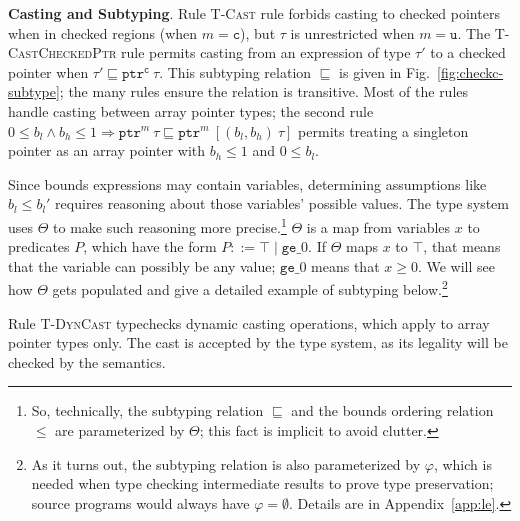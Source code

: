 \documentclass[conference]{IEEEtran}
\newcommand{\myparagraph}[1]{\textbf{#1}.\xspace}
\newcommand{\tarray}[3]{\tarrayb{({#1},{#2})}{#3}}
\newcommand{\tarrayb}[2]{\ensuremath{[{#1}~{#2}]}}
\newcommand{\tptr}[2]{\ensuremath{\mathtt{ptr}^{#2}~{#1}}}
\newcommand{\tarrayptr}[4]{{\tptr{\tarray{#1}{#2}{#3}}{#4}}}
\newcommand{\cmode}{\texttt{c}}
\newcommand{\umode}{\texttt{u}}
\begin{document}
\myparagraph{Casting and Subtyping}
Rule \textsc{T-Cast} rule forbids casting to checked pointers when in checked
regions (when $m = \cmode$), but $\tau$ is unrestricted when
$m = \umode$. The \textsc{T-CastCheckedPtr} rule
permits casting from an expression of type $\tau'$ to a checked pointer when
$\tau' \sqsubseteq \tptr{\tau}{\cmode}$. This subtyping relation
$\sqsubseteq$ is given in Fig.~\ref{fig:checkc-subtype}; the many
rules ensure the relation is transitive. Most of the rules handle
casting between array pointer types; the second rule 
$0\le b_l \wedge b_h \le 1 \Rightarrow \tptr{\tau}{m}\sqsubseteq
\tarrayptr{b_l}{b_h}{\tau}{m}$ permits treating a singleton
pointer as an array pointer with $b_h\le 1$ and $0 \le b_l$.

Since bounds expressions may
contain variables, determining assumptions like $b_l \leq b_l'$
requires reasoning about those variables' possible values. The type
system uses $\Theta$ to make such reasoning more precise.\footnote{So,
  technically, the subtyping relation $\sqsubseteq$ and the bounds
  ordering relation $\leq$ are parameterized by $\Theta$; this fact is
  implicit to avoid clutter.} $\Theta$ is a map from variables $x$ to
predicates $P$, which have the form $P ::= \top \;|\; \texttt{ge}\_0$.
If $\Theta$ maps $x$ to $\top$, that means that the variable can
possibly be any value; $\texttt{ge}\_0$ means that $x \ge 0$. We will
see how $\Theta$ gets populated and give a detailed example of
subtyping below.\footnote{As it turns out, the subtyping relation is
  also parameterized by $\varphi$, which is needed when type checking
  intermediate results to prove type preservation; source programs
  would always have $\varphi = \emptyset$. Details are in
Appendix~\ref{app:le}.}

Rule \textsc{T-DynCast} typechecks dynamic casting operations, which
apply to array pointer types only. The cast is accepted by the type
system, as its legality will be checked by the semantics.
\end{document}
